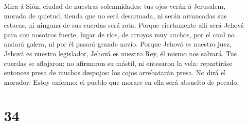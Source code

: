  Mira á Sión, ciudad de nuestras solemnidades: tus ojos
verán á Jerusalem, morada de quietud, tienda que no será desarmada, ni
serán arrancadas sus estacas, ni ninguna de sus cuerdas será rota.
 Porque ciertamente allí será Jehová para con nosotros
fuerte, lugar de ríos, de arroyos muy anchos, por el cual no andará
galera, ni por él pasará grande navío.  Porque Jehová es
nuestro juez, Jehová es nuestro legislador, Jehová es nuestro Rey, él
mismo nos salvará.  Tus cuerdas se aflojaron; no
afirmaron su mástil, ni entesaron la vela: repartiráse entonces presa de
muchos despojos: los cojos arrebatarán presa.  No dirá el
morador: Estoy enfermo: el pueblo que morare en ella será absuelto de
pecado.

\hypertarget{section-33}{%
\section{34}\label{section-33}}

